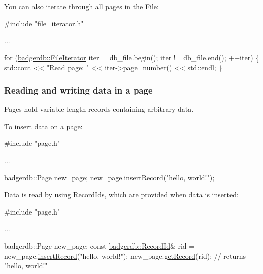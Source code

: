 You can also iterate through all pages in the File\-: 
\begin{DoxyCode}
\textcolor{preprocessor}{#include "file\_iterator.h"}

...

for (\hyperlink{classbadgerdb_1_1FileIterator}{badgerdb::FileIterator} iter = db\_file.begin();
     iter != db\_file.end();
     ++iter) \{
  std::cout << \textcolor{stringliteral}{"Read page: "} << iter->page\_number() << std::endl;
\}
\end{DoxyCode}
\hypertarget{index_page_sec}{}\subsubsection{Reading and writing data in a page}\label{index_page_sec}
Pages hold variable-\/length records containing arbitrary data.

To insert data on a page\-: 
\begin{DoxyCode}
\textcolor{preprocessor}{#include "page.h"}

...

badgerdb::Page new\_page;
new\_page.\hyperlink{classbadgerdb_1_1Page_ad0b1e85fe7849fb767dd8c21a8053cf4}{insertRecord}(\textcolor{stringliteral}{"hello, world!"});
\end{DoxyCode}


Data is read by using Record\-Ids, which are provided when data is inserted\-: 
\begin{DoxyCode}
\textcolor{preprocessor}{#include "page.h"}

...

badgerdb::Page new\_page;
\textcolor{keyword}{const} \hyperlink{structbadgerdb_1_1RecordId}{badgerdb::RecordId}& rid = new\_page.\hyperlink{classbadgerdb_1_1Page_ad0b1e85fe7849fb767dd8c21a8053cf4}{insertRecord}(\textcolor{stringliteral}{"hello, world!"});
new\_page.\hyperlink{classbadgerdb_1_1Page_a77b352920c3e66384317bbcdcd900d99}{getRecord}(rid); \textcolor{comment}{// returns "hello, world!"}
\end{DoxyCode}


